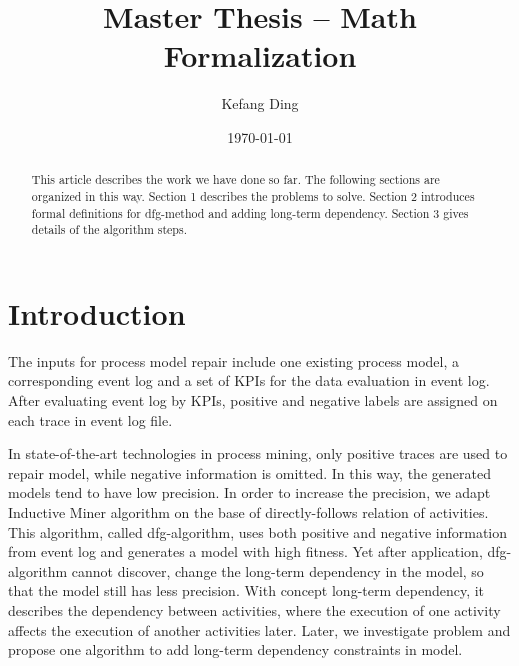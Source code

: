 \documentclass[]{article}
\title{Master Thesis --  Math Formalization}
\author{Kefang Ding}
\date{\today}
\begin{document}
\maketitle

\hrulefill
\hrulefill 

\begin{abstract}
This article describes the work we have done so far. The following sections are organized in this way. Section 1 describes the problems to solve. Section 2 introduces formal definitions for dfg-method and adding long-term dependency. Section 3 gives details of the algorithm steps. 
\end{abstract}

\section{Introduction}
The inputs for process model repair include one existing process model, a corresponding event log and a set of KPIs for the data evaluation in event log. After evaluating event log by KPIs, positive and negative labels are assigned on each trace in event log file. 

In state-of-the-art technologies in process mining, only positive traces are used to repair model, while negative information is omitted. In this way, the generated models tend to have low precision. In order to increase the precision, we adapt Inductive Miner algorithm on the base of directly-follows relation of activities. This algorithm, called dfg-algorithm, uses both positive and negative information from event log and generates a model with high fitness. Yet after application, dfg-algorithm cannot discover, change the long-term dependency in the model, so that the model still has less precision. With concept long-term dependency, it describes the dependency between activities, where the execution of one activity affects the execution of another activities later. Later, we investigate problem and propose one algorithm to add long-term dependency constraints in model. 
\end{document}
